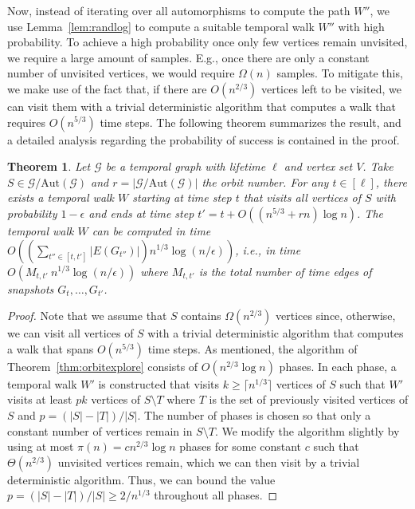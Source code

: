 \documentclass[10pt,a4paper]{article}
\newtheorem{theorem}{Theorem}[section]
\newcommand{\auttg}{\ensuremath{\text{Aut}(\mathcal{G})}}
\newcommand{\torb}{\ensuremath{\mathcal{G}/\auttg}}
\begin{document}
{Now, instead of iterating over all automorphisms to compute the path $W''$, we
use Lemma~\ref{lem:randlog} to compute %
{a suitable}
temporal walk $W''$ with
high probability. {To achieve a high probability once only few
    vertices remain unvisited, we require a large amount of samples. E.g.,
    once there are only a constant number of unvisited vertices, we would
    require $\Omega(n)$ samples. To mitigate this, we make use of the fact
    that, if there are $O(n^{2/3})$ vertices left to be visited, we can visit them with
a trivial deterministic algorithm that computes a walk that requires $O(n^{5/3})$
time steps.}
The following theorem summarizes the result, and a detailed
analysis regarding the probability of success is contained in the proof.

\begin{theorem}\label{thm:randorbitexplore} Let $\mathcal{G}$ be a temporal
    graph with lifetime $\ell$ and vertex set $V$. Take $S \in \torb$ and
    $r=|\torb|$ the orbit number. For any $t\in[\ell]$, there exists a
    temporal walk $W$ starting at time step $t$ that visits all vertices of
    $S$ with probability $1-\epsilon$ and ends at time step
    $t'=t+O((n^{5/3}+rn)\log n)$. The temporal walk $W$ can be computed in
    time $O((\sum_{t'' \in [t, t']} |E(G_{t''})|) n^{1/3}\log (n/\epsilon))$, {i.e.,
    in time $O( M_{t,t'} \ n^{1/3} \log (n/\epsilon))$ where $M_{t,t'}$ is the total number
    of time edges of snapshots $G_t, \ldots, G_{t'}$.}
\end{theorem} 
\begin{proof} 
    Note that we assume that $S$ contains $\Omega(n^{2/3})$ vertices since,
    otherwise, we can visit all vertices of $S$ with a trivial deterministic algorithm that
    computes a walk that spans $O(n^{5/3})$ time steps. As mentioned, the
    algorithm of Theorem~\ref{thm:orbitexplore} consists of $O(n^{2/3}\log
    n)$ phases. In each phase, a temporal {walk $W'$} is constructed that visits
    $k\geq \lceil n^{1/3} \rceil$ vertices of $S$ such that {$W'$ visits} at least
    $pk$ vertices of $S \setminus T$ where $T$ is the set of previously visited
    vertices of $S$ and $p=(|S|-|T|)/|S|$. The number of phases is chosen so
    that only a constant number of vertices remain in $S\setminus T$. We modify
    the algorithm slightly by using at most $\pi(n)=c n^{2/3} \log n$ phases
    for some constant $c$ such that $\Theta(n^{2/3})$ unvisited vertices
    remain, which
    we can then visit by a trivial deterministic algorithm. Thus, we can  bound the value 
    {$p=(|S|-|T|)/|S| \geq 2/n^{1/3}$} throughout all phases.


\end{proof}}
\end{document}
